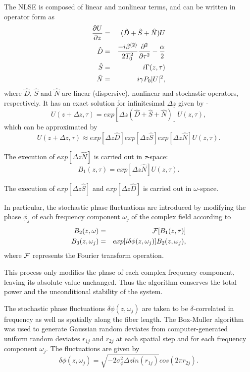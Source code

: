 The NLSE is composed of linear and nonlinear terms, and can be written in operator form as
\begin{eqnarray}
{\partial U \over \partial z} & = & (\hat{D}+\hat{S}+\hat{N})U \nonumber \\
\hat{D}& = & {-i\beta^{(2)} \over 2T_0^2}
{\partial^2 \over \partial\tau^2} - {\alpha \over 2} \nonumber \\
\hat{S} & = & i\Gamma(z,\tau) \nonumber \\
\hat{N} & = & i\gamma P_0|U|^2,
\end{eqnarray}
where $\hat{D}$, $\hat{S}$ and $\hat{N}$ are linear
(dispersive), nonlinear
and stochastic operators, respectively. It has an exact solution for
infinitesimal $\Delta z$ given by -
\begin{equation}
U(z + \Delta z,\tau) = exp[\Delta z(\hat{D} + \hat{S} + \hat{N})]U(z,\tau) ,
\end{equation}
which can be approximated by
\begin{equation}
U(z + \Delta z,\tau) \approx exp[\Delta z \hat{D}]exp[\Delta z \hat{S}]exp[\Delta z \hat{N}]U(z,\tau) .
\end{equation}

The execution of $exp[\Delta z \hat{N}]$ is carried out in $\tau$-space:
\begin{equation}
B_1(z,\tau)=exp[\Delta z \hat{N}]U(z,\tau) .
\end{equation}

The execution of $exp[\Delta z \hat{S}]$ and $exp[\Delta z \hat{D}]$ is
carried out in $\omega$-space.

In particular, the stochastic phase fluctuations are introduced by modifying
the phase $\phi_j$ of each frequency component $\omega_j$ of the complex
field according to
\begin{eqnarray}
B_2(z,\omega) & = & {\cal{F}}[B_1(z,\tau)] \nonumber \\
B_3(z,\omega_{j}) & = & exp[i \delta\phi(z,\omega_j)]B_2(z,\omega_j) ,
\end{eqnarray}
where $\cal{F}$ represents the Fourier transform operation.

This process only modifies the phase of each complex frequency component,
leaving its absolute value unchanged. Thus the algorithm conserves the total
power and the unconditional stability of the system.

The stochastic phase fluctuations $\delta\phi(z,\omega_j)$ are taken to be
$\delta$-correlated in frequency as well as spatially along the fiber length.
The Box-Muller algorithm \cite{boxmuller} was used to generate Gaussian random
deviates from computer-generated uniform random deviates $r_{1j}$ and $r_{2j}$
at each spatial step and for each frequency component $\omega_j$. The
fluctuations are given by
\begin{equation}
\delta\phi(z,\omega_{j}) = \sqrt{-2\sigma_{\phi}^2 \Delta z ln(r_{1j})}cos(2 \pi r_{2j}) .
\end{equation}

